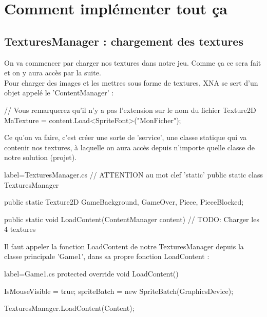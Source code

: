 \documentclass[a4paper]{article}
\begin{document}
\section{Comment implémenter tout ça}

\subsection{TexturesManager : chargement des textures}

On va commencer par charger nos textures dans notre jeu. Comme ça ce sera fait
et on y aura accès par la suite. \\

Pour charger des images et les mettres sous forme de textures, XNA se sert d'un
objet appelé le 'ContentManager' : \\

\begin{csharpcode}
// Vous remarquerez qu'il n'y a pas l'extension sur le nom du fichier
Texture2D MaTexture = content.Load<SpriteFont>("MonFicher");
\end{csharpcode}

\vspace{0.2cm}

Ce qu'on va faire, c'est créer une sorte de 'service', une classe statique qui
va contenir nos textures, à laquelle on aura accès depuis n'importe quelle
classe de notre solution (projet). \\

\begin{csharpcode*}{label=TexturesManager.cs}
// ATTENTION au mot clef 'static'
public static class TexturesManager
{
    public static Texture2D GameBackground,
                            GameOver,
                            Piece,
                            PieceBlocked;

    public static void LoadContent(ContentManager content)
    {
        // TODO: Charger les 4 textures
    }
}
\end{csharpcode*}

\vspace{0.2cm}

Il faut appeler la fonction LoadContent de notre TexturesManager depuis la
classe principale 'Game1', dans sa propre fonction LoadContent : \\

\begin{csharpcode*}{label=Game1.cs}
protected override void LoadContent()
{
    IsMouseVisible = true;
    spriteBatch = new SpriteBatch(GraphicsDevice);

    TexturesManager.LoadContent(Content);
}
\end{csharpcode*}
\end{document}
